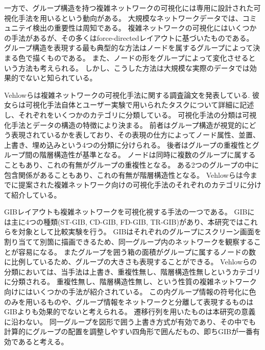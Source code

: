 \documentclass{kuee}
\begin{document}
一方で、グループ構造を持つ複雑ネットワークの可視化には専用に設計された可視化手法を用いるという動向がある。
大規模なネットワークデータでは、コミュニテイ検出の重要性は周知である。
複雑ネットワークの可視化にはいくつかの手法があるが、その多くはforce-directedレイアウトに基づいたものである。
グループ構造を表現する最も典型的な方法はノードを属するグループによって決まる色で描くものである\cite{mcpherson2005discovering}。
また、ノードの形をグループによって変化させるという方法も考えられる。
しかし、こうした方法は大規模な実際のデータでは効果的でないと知られている。

Vehlowらは複雑ネットワークの可視化手法に関する調査論文を発表している\cite{Vehlow2017VisualizingGS}.
彼女らは可視化手法自体とユーザー実験で用いられたタスクについて詳細に記述し、それぞれをいくつかのカテゴリに分類している。
可視化手法の分類は可視化手法とデータの構造の特徴により決まる。
前者はグループ構造が視覚的にどう表現されているかを表しており、その表現の仕方によってノード属性、並置、上書き、埋め込みという4つの分類に分けられる。
後者はグループの重複性とグループ間の階層構造性が基準となる。
ノードは同時に複数のグループに属することもあり、これの有無がグループの重複性となる。
ある2つのグループの中に包含関係があることもあり、これの有無が階層構造性となる。
Vehlowらは今までに提案された複雑ネットワーク向けの可視化手法のそれぞれのカテゴリに分けて紹介している。

GIBレイアウトも複雑ネットワークを可視化視する手法の一つである\cite{rodrigues2011group,chaturvedi2014group,onoue2017optimal}。
GIBには主に4つの種類(ST-GIB, CD-GIB, FD-GIB, TR-GIB)があり、本研究ではこれらを対象として比較実験を行う。
GIBはそれぞれのグループにスクリーン画面を割り当てて別箇に描画できるため、同一グループ内のネットワークを観察することが容易になる。
またグループを囲う箱の面積がグループに属するノードの数に比例しているため、グループの大きさも表現することができる。
Vehlowらの分類においては、当手法は上書き、重複性無し、階層構造性無しというカテゴリに分類される。
重複性無し、階層構造性無し、という性質の複雑ネットワーク向けにはいくつかの手法が紹介されている\cite{chaturvedi2014group,henry2007nodetrix,shneiderman2006network,bach2013graphdiaries,dekker2001visualisation}。
この内グループ情報の符号化に色のみを用いるものや、グループ情報をネットワークと分離して表現するものはGIBよりも効果的でないと考えられる。
遷移行列を用いたものは本研究の意義に沿わない。
同一グループを図形で囲う上書き方式が有効であり、その中でも計算的にグループの配置を調整しやすい四角形で囲んだもの、即ちGIBが一番有効であると考える。
\end{document}
